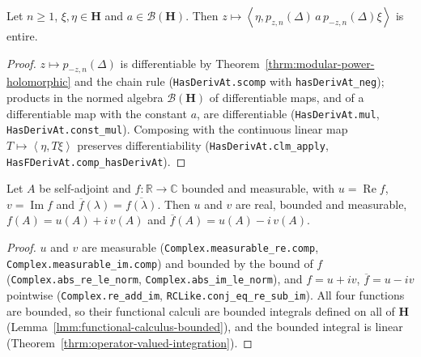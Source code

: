 \begin{corollary}
    \label{crllr:modular-power-matrix-coefficients}
    \leanok
    Let $n \ge 1$, $\xi, \eta \in \mathbf{H}$ and $a \in \mathcal{B}(\mathbf{H})$. Then $z \mapsto \left< \eta, p_{z,n}(\Delta)\,a\,p_{-z,n}(\Delta)\xi \right>$ is entire.
\end{corollary}
\begin{proof}
    \leanok
    $z \mapsto p_{-z,n}(\Delta)$ is differentiable by Theorem~\ref{thrm:modular-power-holomorphic} and the chain rule (\texttt{HasDerivAt.scomp} with \texttt{hasDerivAt\_neg}); products in the normed algebra $\mathcal{B}(\mathbf{H})$ of differentiable maps, and of a differentiable map with the constant $a$, are differentiable (\texttt{HasDerivAt.mul}, \texttt{HasDerivAt.const\_mul}). Composing with the continuous linear map $T \mapsto \left< \eta, T\xi \right>$ preserves differentiability (\texttt{HasDerivAt.clm\_apply}, \texttt{HasFDerivAt.comp\_hasDerivAt}).
\end{proof}

\begin{lemma}
    \label{lmm:fc-bounded-re-im}
    \leanok
    Let $A$ be self-adjoint and $f : \mathbb{R} \to \mathbb{C}$ bounded and measurable, with $u = \operatorname{Re} f$, $v = \operatorname{Im} f$ and $\overline{f}(\lambda) = \overline{f(\lambda)}$. Then $u$ and $v$ are real, bounded and measurable, $f(A) = u(A) + i\,v(A)$ and $\overline{f}(A) = u(A) - i\,v(A)$.
\end{lemma}
\begin{proof}
    \leanok
    $u$ and $v$ are measurable (\texttt{Complex.measurable\_re.comp}, \texttt{Complex.measurable\_im.comp}) and bounded by the bound of $f$ (\texttt{Complex.abs\_re\_le\_norm}, \texttt{Complex.abs\_im\_le\_norm}), and $f = u + iv$, $\overline{f} = u - iv$ pointwise (\texttt{Complex.re\_add\_im}, \texttt{RCLike.conj\_eq\_re\_sub\_im}). All four functions are bounded, so their functional calculi are bounded integrals defined on all of $\mathbf{H}$ (Lemma~\ref{lmm:functional-calculus-bounded}), and the bounded integral is linear (Theorem~\ref{thrm:operator-valued-integration}).
\end{proof}

